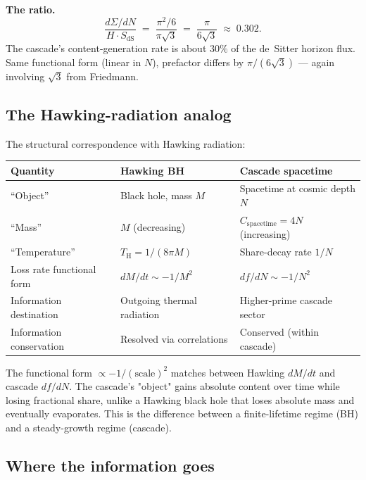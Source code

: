 \documentclass[11pt,a4paper]{article}
\begin{document}
\textbf{The ratio.}
\[
\frac{d\Sigma/dN}{H \cdot S_{\mathrm{dS}}}
\;=\; \frac{\pi^2/6}{\pi\sqrt{3}}
\;=\; \frac{\pi}{6\sqrt{3}}
\;\approx\; 0.302.
\]
The cascade's content-generation rate is about $30\%$ of the
de~Sitter horizon flux. Same functional form (linear in $N$),
prefactor differs by $\pi/(6\sqrt{3})$ --- again involving
$\sqrt{3}$ from Friedmann.

\subsection*{The Hawking-radiation analog}

The structural correspondence with Hawking radiation:

\begin{center}
\renewcommand{\arraystretch}{1.3}
\begin{tabular}{lll}
\toprule
Quantity & Hawking BH & Cascade spacetime \\
\midrule
``Object'' & Black hole, mass $M$ & Spacetime at cosmic depth $N$ \\
``Mass'' & $M$ (decreasing) & $C_{\mathrm{spacetime}} = 4N$ (increasing) \\
``Temperature'' & $T_{\mathrm{H}} = 1/(8\pi M)$ & Share-decay rate $1/N$ \\
Loss rate functional form & $dM/dt \sim -1/M^2$ & $df/dN \sim -1/N^2$ \\
Information destination & Outgoing thermal radiation & Higher-prime cascade sector \\
Information conservation & Resolved via correlations & Conserved (within cascade) \\
\bottomrule
\end{tabular}
\end{center}

\noindent The functional form $\propto -1/(\text{scale})^2$ matches
between Hawking $dM/dt$ and cascade $df/dN$. The cascade's
"object" gains absolute content over time while losing fractional
share, unlike a Hawking black hole that loses absolute mass and
eventually evaporates. This is the difference between a
finite-lifetime regime (BH) and a steady-growth regime (cascade).

\subsection*{Where the information goes}
\end{document}
